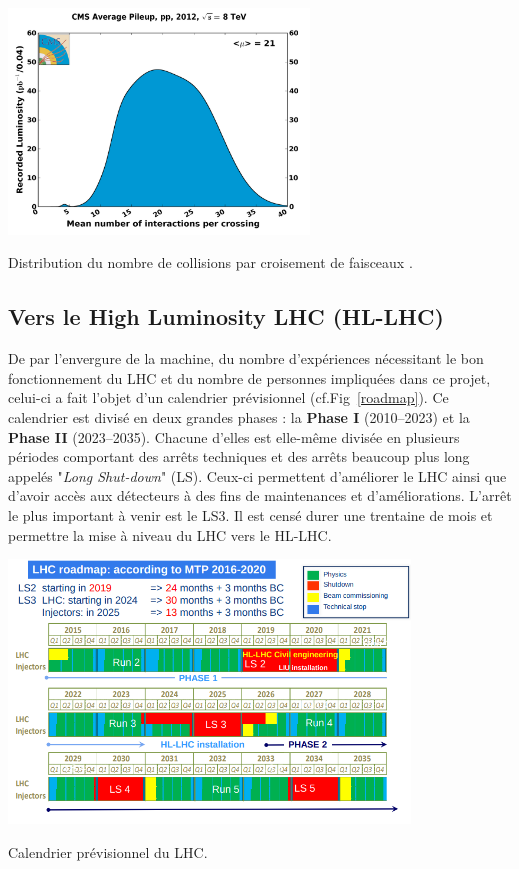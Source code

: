 \begin{minipagewithmarginpars}[ht!]{0.95\textwidth}
	\centering
	\includegraphics[width=0.60\textwidth]{LHC/pileup.png}
	\captionsetup{type=figure}\caption{Distribution du nombre de collisions par croisement de faisceaux \cite{lumipileup}.}
	\label{pile-up}	
\end{minipagewithmarginpars}

\subsection{Vers le High Luminosity LHC (HL-LHC)}
De par l'envergure de la machine, du nombre d'expériences nécessitant le bon fonctionnement du LHC et du nombre de personnes impliquées dans ce projet, celui-ci a fait l'objet d'un calendrier prévisionnel (cf.Fig~\ref{roadmap}). Ce calendrier est divisé en deux grandes phases : la \textbf{Phase I} (\num{2010}--\num{2023}) et la  \textbf{Phase II} (\num{2023}--\num{2035}). Chacune d'elles est elle-même divisée en plusieurs périodes comportant des arrêts techniques et des arrêts beaucoup plus long appelés "\textit{Long Shut-down}" (LS). Ceux-ci permettent d'améliorer le LHC ainsi que d'avoir accès aux détecteurs à des fins de maintenances et d'améliorations. L'arrêt le plus important à venir est le LS3. Il est censé durer une trentaine de mois et permettre la mise à niveau du LHC vers le HL-LHC.

\begin{minipagewithmarginpars}[ht!]{0.95\textwidth}
	\centering
	\includegraphics[width=0.80\textwidth]{LHC/roadmap.png}
	\captionsetup{type=figure}\caption{Calendrier prévisionnel du LHC.}
	\label{roadmap}	
\end{minipagewithmarginpars}

